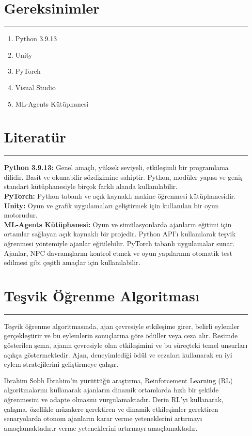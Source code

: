 \documentclass{article}
\begin{document}
\section{Gereksinimler}
\rule{\textwidth}{0.5pt}
\begin{enumerate}
    \item Python 3.9.13
    \item Unity
    \item PyTorch
    \item Visual Studio  
    \item ML-Agents Kütüphanesi\\[5pt]
\end{enumerate}

\section{Literatür}
\rule{\textwidth}{0.5pt}
\par \textbf{Python 3.9.13:} Genel amaçlı, yüksek seviyeli, etkileşimli bir programlama dilidir. Basit ve okunabilir sözdizimine sahiptir. Python, modüler yapısı ve geniş standart kütüphanesiyle birçok farklı alanda kullanılabilir.\\[5pt]

\textbf{PyTorch:} Python tabanlı ve açık kaynaklı makine öğrenmesi kütüphanesidir.\\[5pt]

\textbf{Unity:} Oyun ve grafik uygulamaları geliştirmek için kullanılan bir oyun motorudur.\\[5pt]

\textbf{ML-Agents Kütüphanesi:} Oyun ve simülasyonlarda ajanların eğitimi için ortamlar sağlayan açık kaynaklı bir projedir. Python API'ı kullanılarak teşvik öğrenmesi yöntemiyle ajanlar eğitilebilir. PyTorch tabanlı uygulamalar sunar. Ajanlar, NPC davranışlarını kontrol etmek ve oyun yapılarının otomatik test edilmesi gibi çeşitli amaçlar için kullanılabilir.


\section{Teşvik Öğrenme Algoritması}
\rule{\textwidth}{0.5pt}
\par Teşvik öğrenme algoritmasında, ajan çevresiyle etkileşime girer, belirli eylemler gerçekleştirir ve bu eylemlerin sonuçlarına göre ödüller veya ceza alır. Resimde gösterilen şema, ajanın çevresiyle olan etkileşimini ve bu süreçteki temel unsurları açıkça göstermektedir. Ajan, deneyimlediği ödül ve cezaları kullanarak en iyi eylem stratejilerini geliştirmeye çalışır.
\newline
\par Ibrahim Sobh Ibrahim'in yürüttüğü araştırma\cite{kiran2021deep}, Reinforcement Learning (RL) algoritmalarını kullanarak ajanların dinamik ortamlarda hızlı bir şekilde öğrenmesini ve adapte olmasını vurgulamaktadır. Derin RL'yi kullanarak, çalışma, özellikle müzakere gerektiren ve dinamik etkileşimler gerektiren senaryolarda otonom ajanların karar verme yeteneklerini artırmayı amaçlamaktadır.r verme yeteneklerini artırmayı amaçlamaktadır.\\[5pt]
\end{document}
